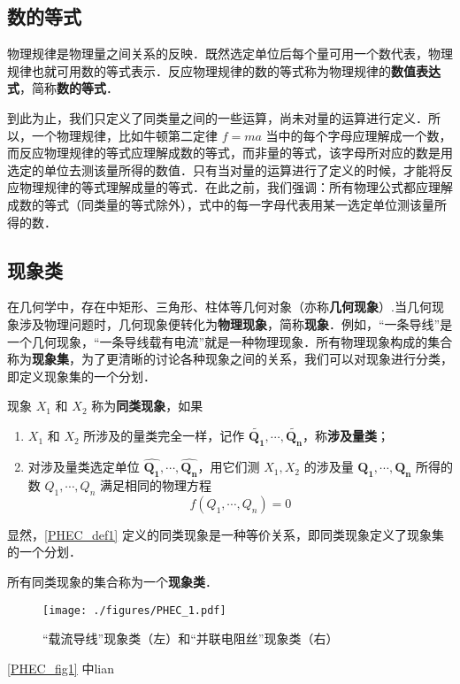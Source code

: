 
\subsection{数的等式}
物理规律是物理量之间关系的反映．既然选定单位后每个量可用一个数代表，物理规律也就可用数的等式表示．反应物理规律的数的等式称为物理规律的\textbf{数值表达式}，简称\textbf{数的等式}．

到此为止，我们只定义了同类量之间的一些运算，尚未对量的运算进行定义．所以，一个物理规律，比如牛顿第二定律 $f=ma$ 当中的每个字母应理解成一个数，而反应物理规律的等式应理解成数的等式，而非量的等式，该字母所对应的数是用选定的单位去测该量所得的数值．只有当对量的运算进行了定义的时候，才能将反应物理规律的等式理解成量的等式．在此之前，我们强调：所有物理公式都应理解成数的等式（同类量的等式除外），式中的每一字母代表用某一选定单位测该量所得的数．
\subsection{现象类}
在几何学中，存在中矩形、三角形、柱体等几何对象（亦称\textbf{几何现象}）.当几何现象涉及物理问题时，几何现象便转化为\textbf{物理现象}，简称\textbf{现象}．例如，“一条导线”是一个几何现象，“一条导线载有电流”就是一种物理现象．所有物理现象构成的集合称为\textbf{现象集}，为了更清晰的讨论各种现象之间的关系，我们可以对现象进行分类，即定义现象集的一个分划．

\begin{definition}{}\label{PHEC_def1}
现象 $X_1$ 和 $X_2$ 称为\textbf{同类现象}，如果
\begin{enumerate}
\item $X_1$ 和 $X_2$ 所涉及的量类完全一样，记作 $\tilde{\boldsymbol{Q_1}},\cdots,\tilde{\boldsymbol{Q_n}}$，称\textbf{涉及量类}； 
\item 对涉及量类选定单位 $\hat{\boldsymbol{Q_1}},\cdots,\hat{\boldsymbol{Q_n}}$，用它们测 $X_1,X_2$ 的涉及量 $\boldsymbol{Q_1},\cdots ,\boldsymbol{Q_n}$ 所得的数 $Q_1,\cdots,Q_n$ 满足相同的物理方程
\begin{equation}
f(Q_1,\cdots,Q_n)=0
\end{equation}
\end{enumerate}
\end{definition}
显然，\autoref{PHEC_def1} 定义的同类现象是一种等价关系，即同类现象定义了现象集的一个分划．
\begin{definition}{}
所有同类现象的集合称为一个\textbf{现象类}．
\end{definition}
\begin{example}{}
\begin{figure}[ht]
\centering
\texttt{[image: ./figures/PHEC\_1.pdf]}
\caption{“载流导线”现象类（左）和“并联电阻丝”现象类（右）} \label{PHEC_fig1}
\end{figure}
\autoref{PHEC_fig1} 中lian
\end{example}